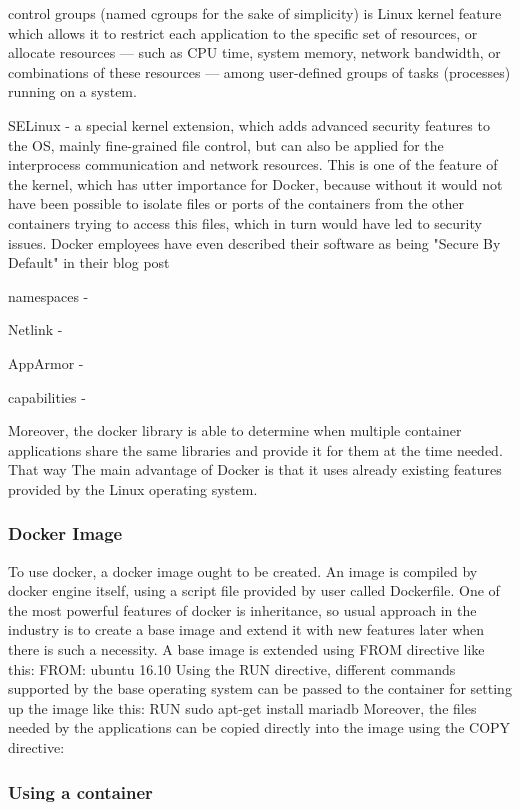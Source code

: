 control groups (named cgroups for the sake of simplicity) is
Linux kernel feature which allows it to restrict
each application to the specific set of resources, or allocate resources —
such as CPU time, system memory, network bandwidth,
or combinations of these resources — among user-defined groups
of tasks (processes) running on a system.\cite{CGroupsDefinition}

SELinux - a special kernel extension, which adds advanced security features to
the OS, mainly fine-grained file control, but can also be applied
for the interprocess communication and network resources. \cite{SELinuxDef}
This is one of the feature of the kernel, which has utter importance for Docker,
because without it would not have been possible to isolate files or ports
of the containers from the other containers trying to access this files,
which in turn would have led to security issues.
Docker employees have even described their software as being "Secure By Default"
in their blog post \cite{SELinuxDockBlog}

namespaces -

Netlink -

AppArmor -

capabilities -

Moreover, the docker library is able to determine when multiple container
applications share the same libraries
and provide it for them at the time needed.
That way
The main advantage of Docker is that it uses already existing features
provided by the Linux operating system.

\subsubsection{Docker Image}

To use docker, a docker image ought to be created.
An image is compiled by docker engine itself,
using a script file provided by user called Dockerfile.
One of the most powerful features of docker is inheritance,
 so usual approach in the industry
is to create a base image and extend it with
new features later when there is such a necessity.
A base image is extended using FROM directive like this:
FROM: ubuntu 16.10
Using the RUN directive, different commands supported by the base operating
system can be passed to the container for setting up the image like this:
RUN sudo apt-get install mariadb
Moreover, the files needed by the applications can be copied directly
into the image using the COPY directive:

\subsubsection{Using a container}

